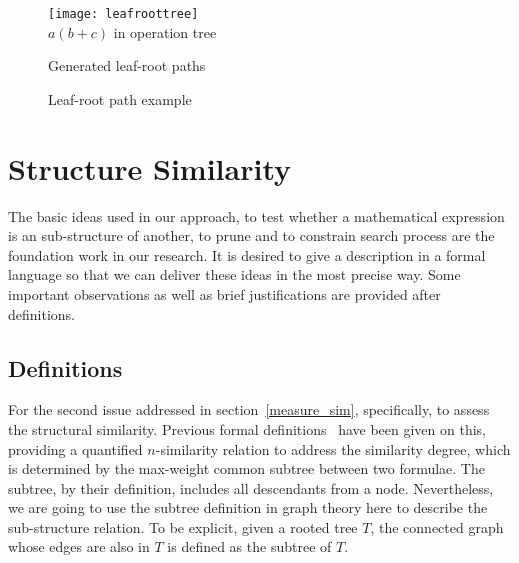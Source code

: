 \begin{figure}
\begin{minipage}[b]{2.65in}
\begin{center}
\texttt{[image: leafroottree]}
\\$a(b+c)$ in operation tree
\end{center}
\end{minipage}
\hspace*{.38in}
\begin{minipage}[b]{2.65in}
\begin{center}
Generated leaf-root paths
\end{center}
\end{minipage}
\caption{Leaf-root path example}\label{oprtreeExample}
\end{figure}

\section{Structure Similarity}
The basic ideas used in our approach, to test whether a mathematical expression is an sub-structure of another, to prune and to constrain search process are the foundation work in our research. It is desired to give a description in a formal language so that we can deliver these ideas in the most precise way. Some important observations as well as brief justifications are provided after definitions.

\subsection{Definitions}
For the second issue addressed in section~\ref{measure_sim}, specifically, to assess the structural similarity. 
Previous formal definitions~\cite{improving09} have been given on this, providing a quantified \mbox{$n$-similarity} relation to address the similarity degree, which is determined by the max-weight common subtree between two formulae. 
The subtree, by their definition, includes all descendants from a node. 
Nevertheless, we are going to use the subtree definition in graph theory here to describe the sub-structure relation. 
To be explicit, given a rooted tree $T$, the connected graph whose edges are also in $T$ is defined as the subtree of $T$.  

